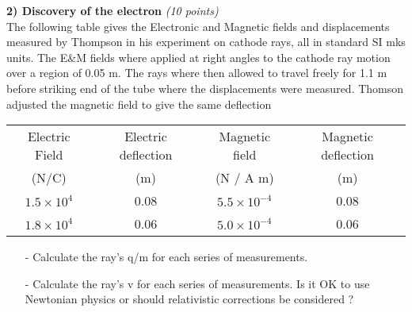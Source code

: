 {\large

\textbf{2) Discovery of the electron } \hfill  \textit{(10 points)}\\
The following table gives the Electronic and Magnetic fields and displacements measured by Thompson in his experiment on cathode rays, all in standard SI mks units.
The E\&M fields where applied at right angles to the cathode ray motion over a region of 0.05 m.
The rays where then allowed to travel freely for 1.1 m before striking end of the tube where the displacements were measured.
Thomson adjusted the magnetic field to give the same deflection 

\begin{table}[h]
\centering
\begin{tabular}{cccc}
Electric Field &  Electric deflection & Magnetic field & Magnetic deflection \\
(N/C) & (m) &  (N / A m)  &  (m) \\
\hline
$1.5 \times 10^4$ & 0.08 & $5.5\times 10^{-4}$ & 0.08 \\
$1.8 \times 10^4$ & 0.06 & $5.0\times 10^{-4}$ & 0.06 \\
\end{tabular}
\end{table}

\begin{itemize}
\item[-]Calculate the ray's q/m for each series of measurements.
\item[-]Calculate the ray's v for each series of measurements. Is it OK to use Newtonian physics or should relativistic corrections be considered ?
\end{itemize}

\vspace*{0.25in}

}
